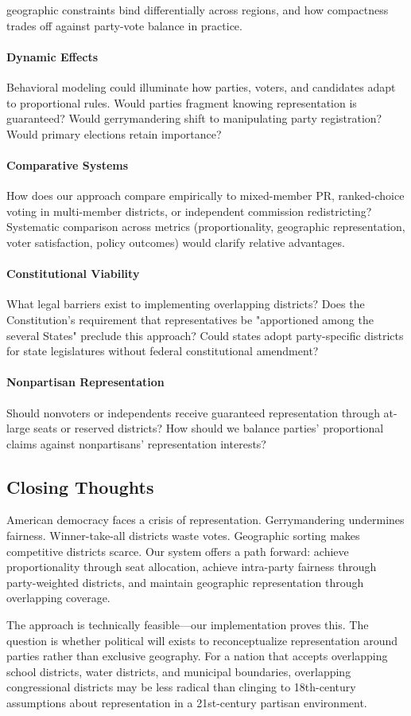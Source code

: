  geographic constraints bind differentially across regions, and how compactness trades off against party-vote balance in practice.

\paragraph{Dynamic Effects}
Behavioral modeling could illuminate how parties, voters, and candidates adapt to proportional rules. Would parties fragment knowing representation is guaranteed? Would gerrymandering shift to manipulating party registration? Would primary elections retain importance?

\paragraph{Comparative Systems}
How does our approach compare empirically to mixed-member PR, ranked-choice voting in multi-member districts, or independent commission redistricting? Systematic comparison across metrics (proportionality, geographic representation, voter satisfaction, policy outcomes) would clarify relative advantages.

\paragraph{Constitutional Viability}
What legal barriers exist to implementing overlapping districts? Does the Constitution's requirement that representatives be "apportioned among the several States" preclude this approach? Could states adopt party-specific districts for state legislatures without federal constitutional amendment?

\paragraph{Nonpartisan Representation}
Should nonvoters or independents receive guaranteed representation through at-large seats or reserved districts? How should we balance parties' proportional claims against nonpartisans' representation interests?

\subsection{Closing Thoughts}

American democracy faces a crisis of representation. Gerrymandering undermines fairness. Winner-take-all districts waste votes. Geographic sorting makes competitive districts scarce. Our system offers a path forward: achieve proportionality through seat allocation, achieve intra-party fairness through party-weighted districts, and maintain geographic representation through overlapping coverage.

The approach is technically feasible---our implementation proves this. The question is whether political will exists to reconceptualize representation around parties rather than exclusive geography. For a nation that accepts overlapping school districts, water districts, and municipal boundaries, overlapping congressional districts may be less radical than clinging to 18th-century assumptions about representation in a 21st-century partisan environment.
